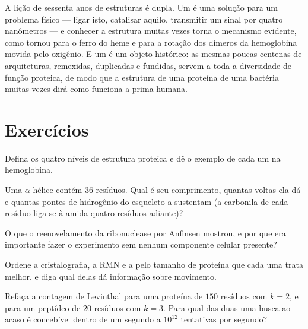 \begin{remark}\label{rem:b3:structural-biology:sf}
A lição de sessenta anos de estruturas é dupla. Um  é uma
solução para um problema físico --- ligar isto, catalisar aquilo,
transmitir um sinal por quatro nanômetros --- e conhecer a estrutura
muitas vezes torna o mecanismo evidente, como tornou para o ferro do
heme e para a rotação dos dímeros da hemoglobina movida pelo oxigênio.
E um  é um objeto histórico: as mesmas poucas centenas de
arquiteturas, remexidas, duplicadas e fundidas, servem a toda a
diversidade de função proteica, de modo que a estrutura de uma proteína
de uma bactéria muitas vezes dirá como funciona a prima humana.
\end{remark}

\section{Exercícios}

\begin{exercise}[$\star$]\label{exo:b3:structural-biology:1}
Defina os quatro níveis de estrutura proteica e dê o exemplo de cada um
na hemoglobina.
\end{exercise}

\begin{exercise}[$\star$]\label{exo:b3:structural-biology:2}
Uma $\alpha$-hélice contém $36$ resíduos. Qual é seu comprimento,
quantas voltas ela dá e quantas pontes de hidrogênio do esqueleto a
sustentam (a carbonila de cada resíduo liga-se à amida quatro resíduos
adiante)?
\end{exercise}

\begin{exercise}[$\star$]\label{exo:b3:structural-biology:3}
O que o reenovelamento da ribonuclease por Anfinsen mostrou, e por que
era importante fazer o experimento sem nenhum componente celular
presente?
\end{exercise}

\begin{exercise}[$\star$]\label{exo:b3:structural-biology:4}
Ordene a cristalografia, a RMN e a  pelo
tamanho de proteína que cada uma trata melhor, e diga qual delas dá
informação sobre movimento.
\end{exercise}

\begin{exercise}[$\star\star$]\label{exo:b3:structural-biology:5}
Refaça a contagem de Levinthal para uma proteína de $150$ resíduos com
$k = 2$, e para um peptídeo de $20$ resíduos com $k = 3$. Para qual das
duas uma busca ao acaso é concebível dentro de um segundo a $10^{12}$
tentativas por segundo?
\end{exercise}

